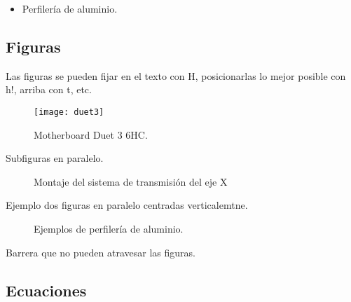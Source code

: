 \begin{itemize}[label={\scriptsize\raisebox{0.5ex}{\textbullet}}]

	\item Perfilería de aluminio.

\end{itemize}




\subsection{Figuras}

Las figuras se pueden fijar en el texto con H, posicionarlas lo mejor posible con h!, arriba con t, etc.

\begin{figure}[H]
	\centering
	\texttt{[image: duet3]}
	\caption{Motherboard Duet 3 6HC.}
	\label{fig:000_00}
\end{figure}

Subfiguras en paralelo.

\begin{figure}[H]
	\centering
	\hspace*{10mm}
	\caption{Montaje del sistema de transmisión del eje X}
	\label{fig:mont_nema}
\end{figure}


Ejemplo dos figuras en paralelo centradas verticalemtne.

\begin{figure}[H]
	\begin{minipage}{\textwidth}
		\centering
	\hspace*{.2in}
	\end{minipage}
	\caption{Ejemplos de perfilería de aluminio.}
	\label{fig:perfileria_alumnio}
\end{figure}

Barrera que no pueden atravesar las figuras.
\FloatBarrier



\subsection{Ecuaciones}


